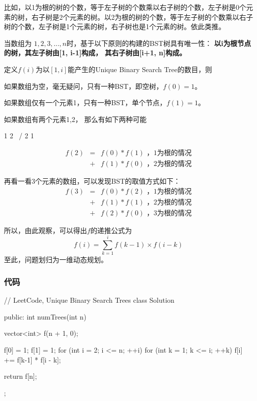 比如，以1为根的树的个数，等于左子树的个数乘以右子树的个数，左子树是0个元素的树，右子树是2个元素的树。以2为根的树的个数，等于左子树的个数乘以右子树的个数，左子树是1个元素的树，右子树也是1个元素的树。依此类推。

当数组为 $1,2,3,...,n$时，基于以下原则的构建的BST树具有唯一性：
\textbf{以i为根节点的树，其左子树由[1, i-1]构成， 其右子树由[i+1, n]构成。}

定义$f(i)$为以$[1,i]$能产生的Unique Binary Search Tree的数目，则

如果数组为空，毫无疑问，只有一种BST，即空树，$f(0)=1$。

如果数组仅有一个元素{1}，只有一种BST，单个节点，$f(1)=1$。

如果数组有两个元素{1,2}， 那么有如下两种可能
\begin{Code}
1             2
  \          /
    2      1
\end{Code}

\begin{eqnarray}
f(2) &=& f(0) * f(1)   \text{ ，1为根的情况} \nonumber \\
     &+& f(1) * f(0)   \text{ ，2为根的情况} \nonumber
\end{eqnarray}

再看一看3个元素的数组，可以发现BST的取值方式如下：
\begin{eqnarray}
f(3) &=& f(0) * f(2)   \text{ ，1为根的情况} \nonumber \\
     &+& f(1) * f(1)   \text{ ，2为根的情况} \nonumber \\
     &+& f(2) * f(0)   \text{ ，3为根的情况} \nonumber
\end{eqnarray}

所以，由此观察，可以得出$f$的递推公式为
$$
f(i) = \sum_{k=1}^{i} f(k-1) \times f(i-k)
$$
至此，问题划归为一维动态规划。


\subsubsection{代码}

\begin{Code}
// LeetCode, Unique Binary Search Trees
class Solution {
public:
    int numTrees(int n) {
        vector<int> f(n + 1, 0);

        f[0] = 1;
        f[1] = 1;
        for (int i = 2; i <= n; ++i) {
            for (int k = 1; k <= i; ++k)
                f[i] += f[k-1] * f[i - k];
        }

        return f[n];
    }
};
\end{Code}


